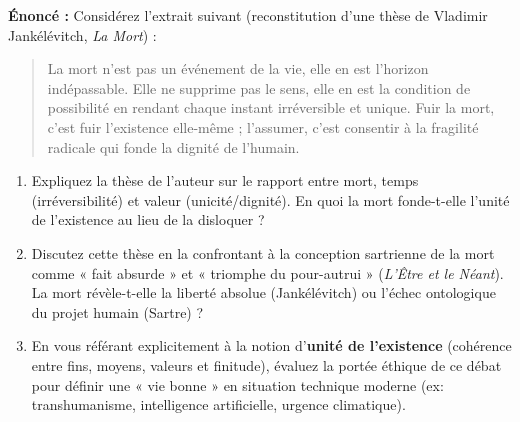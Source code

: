 \documentclass[11pt]{article}
\begin{document}
\begin{exercice}
\textbf{Énoncé :} Considérez l'extrait suivant (reconstitution d'une thèse de Vladimir Jankélévitch, \textit{La Mort}) : 
\begin{quote}
\og La mort n'est pas un événement de la vie, elle en est l'horizon indépassable. Elle ne supprime pas le sens, elle en est la condition de possibilité en rendant chaque instant irréversible et unique. Fuir la mort, c'est fuir l'existence elle-même ; l'assumer, c'est consentir à la fragilité radicale qui fonde la dignité de l'humain. \fg
\end{quote}
\begin{enumerate}
    \item[2 pts] Expliquez la thèse de l'auteur sur le rapport entre mort, temps (irréversibilité) et valeur (unicité/dignité). En quoi la mort fonde-t-elle l'unité de l'existence au lieu de la disloquer ?
    \item[3 pts] Discutez cette thèse en la confrontant à la conception sartrienne de la mort comme « fait absurde » et « triomphe du pour-autrui » (\textit{L'Être et le Néant}). La mort révèle-t-elle la liberté absolue (Jankélévitch) ou l'échec ontologique du projet humain (Sartre) ?
    \item[2 pts] En vous référant explicitement à la notion d'\textbf{unité de l'existence} (cohérence entre fins, moyens, valeurs et finitude), évaluez la portée éthique de ce débat pour définir une « vie bonne » en situation technique moderne (ex: transhumanisme, intelligence artificielle, urgence climatique).
\end{enumerate}
\end{exercice}
\end{document}

